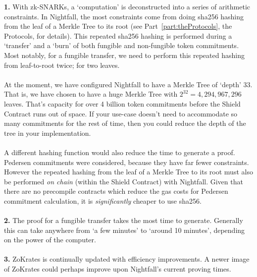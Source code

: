 \textbf{1.}
With zk-SNARKs, a `computation' is deconstructed into a series of arithmetic constraints. In Nightfall, the most constraints come from doing sha256 hashing from the leaf of a Merkle Tree to its root (see Part~\ref{part:theProtocols}, the Protocols, for details). This repeated sha256 hashing is performed during a `transfer' and a `burn' of both fungible and non-fungible token commitments. Most notably, for a fungible transfer, we need to perform this repeated hashing from leaf-to-root twice; for two leaves.\\
\\
At the moment, we have configured Nightfall to have a Merkle Tree of `depth' 33. That is, we have chosen to have a huge Merkle Tree with $2^{32} = 4,294,967,296$ leaves. That's capacity for over 4 billion token commitments before the Shield Contract runs out of space. If your use-case doesn't need to accommodate so many commitments for the rest of time, then you could reduce the depth of the tree in your implementation.\\
\\
A different hashing function would also reduce the time to generate a proof. Pedersen commitments were considered, because they have far fewer constraints.  However the repeated hashing from the leaf of a Merkle Tree to its root must also be performed \textit{on chain} (within the Shield Contract) with Nightfall. Given that there are no precompile contracts which reduce the gas costs for Pedersen commitment calculation, it is \textit{significantly} cheaper to use sha256.\\
\\
\textbf{2.}
The proof for a fungible transfer takes the most time to generate. Generally this can take anywhere from `a few minutes' to `around 10 minutes', depending on the power of the computer.\\
\\
\textbf{3.}
ZoKrates is continually updated with efficiency improvements. A newer image of ZoKrates could perhaps improve upon Nightfall's current proving times.
